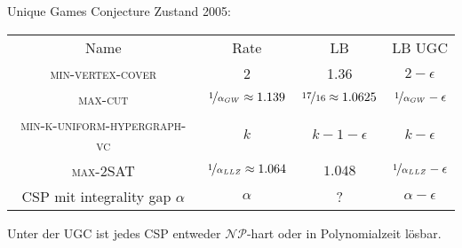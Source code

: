 \documentclass[table,german,10pt]{beamer}
\begin{document}
\begin{frame}{Unique Games Conjecture}
    Zustand 2005:
    
  \begin{table}
    \centering

    \begin{tabular}{|c|c|c|c|}
      Name & Rate & LB & LB UGC\\
      \textsc{min-vertex-cover} & 2 & 1{.}36 & $2-\epsilon$\\
      \textsc{max-cut} & $\nicefrac{1}{\alpha_{GW}}\approx 1{.}139$ &
      $\nicefrac{17}{16}\approx 1.0625$ & $\nicefrac{1}{\alpha_{GW}}-\epsilon$\\
      \textsc{min-k-uniform-hypergraph-vc} & $k$ & $k-1-\epsilon$ & $k-\epsilon$\\
      \textsc{max-2SAT} & $\nicefrac{1}{\alpha_{LLZ}}\approx 1{.}064$ &
      $1{.}048$ & $\nicefrac{1}{\alpha_{LLZ}}-\epsilon$\\
      \textsc{CSP} mit integrality gap $\alpha$ & $\alpha$ & ? & $\alpha-\epsilon$
    \end{tabular}
  \end{table}

\pause

\begin{theorem}[Raghavendra, 2008]
  Unter der UGC ist jedes CSP entweder $\mathcal{NP}$-hart oder in
  Polynomialzeit lösbar.
\end{theorem}
  
\end{frame}
\end{document}
